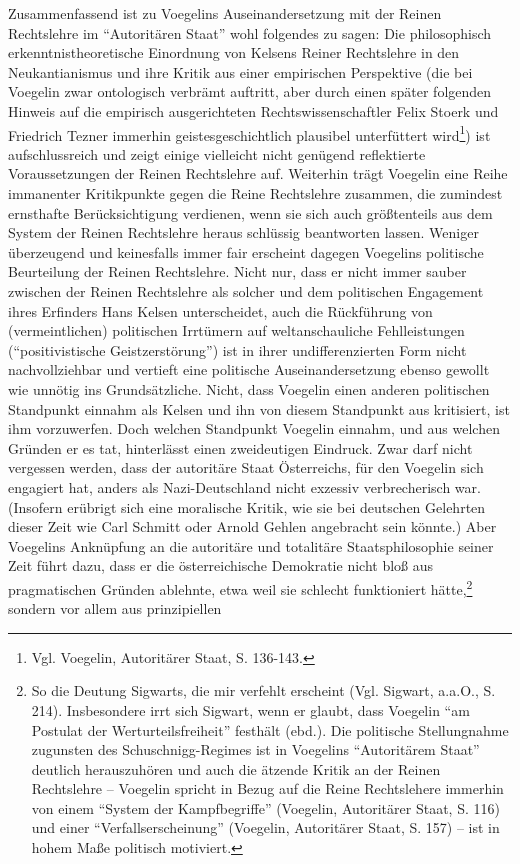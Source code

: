 \documentclass[12pt,a4paper,ngerman]{article}
\begin{document}
Zusammenfassend ist zu Voegelins Auseinandersetzung mit der Reinen Rechtslehre
im "`Autoritären Staat"' wohl folgendes zu sagen: Die philosophisch
erkenntnistheoretische Einordnung von Kelsens Reiner Rechtslehre in den
Neukantianismus und ihre Kritik aus einer empirischen Perspektive (die bei
Voegelin zwar ontologisch verbrämt auftritt, aber durch einen später folgenden
Hinweis auf die empirisch ausgerichteten Rechtswissenschaftler Felix Stoerk
und Friedrich Tezner immerhin geistesgeschichtlich plausibel unterfüttert
wird\footnote{Vgl.  Voegelin, Autoritärer Staat, S. 136-143.}) ist
aufschlussreich und zeigt einige vielleicht nicht genügend reflektierte
Voraussetzungen der Reinen Rechtslehre auf. Weiterhin trägt Voegelin eine
Reihe immanenter Kritikpunkte gegen die Reine Rechtslehre zusammen, die
zumindest ernsthafte Berücksichtigung verdienen, wenn sie sich auch
größtenteils aus dem System der Reinen Rechtslehre heraus schlüssig
beantworten lassen. Weniger überzeugend und keinesfalls immer fair erscheint
dagegen Voegelins politische Beurteilung der Reinen Rechtslehre. Nicht nur,
dass er nicht immer sauber zwischen der Reinen Rechtslehre als solcher und dem
politischen Engagement ihres Erfinders Hans Kelsen unterscheidet, auch die
Rückführung von (vermeintlichen) politischen Irrtümern auf weltanschauliche
Fehlleistungen ("`positivistische Geistzerstörung"') ist in ihrer
undifferenzierten Form nicht nachvollziehbar und vertieft eine politische
Auseinandersetzung ebenso gewollt wie unnötig ins Grundsätzliche.  Nicht, dass
Voegelin einen anderen politischen Standpunkt einnahm als Kelsen und ihn von
diesem Standpunkt aus kritisiert, ist ihm vorzuwerfen. Doch welchen Standpunkt
Voegelin einnahm, und aus welchen Gründen er es tat, hinterlässt einen
zweideutigen Eindruck. Zwar darf nicht vergessen werden, dass der autoritäre
Staat Österreichs, für den Voegelin sich engagiert hat, anders als
Nazi-Deutschland nicht exzessiv verbrecherisch war.  (Insofern erübrigt sich
eine moralische Kritik, wie sie bei deutschen Gelehrten dieser Zeit wie Carl
Schmitt oder Arnold Gehlen angebracht sein könnte.)  Aber Voegelins Anknüpfung
an die autoritäre und totalitäre Staatsphilosophie seiner Zeit führt dazu,
dass er die österreichische Demokratie nicht bloß aus pragmatischen Gründen
ablehnte, etwa weil sie schlecht funktioniert hätte,\footnote{So die Deutung
  Sigwarts, die mir verfehlt erscheint (Vgl. Sigwart, a.a.O., S. 214).
  Insbesondere irrt sich Sigwart, wenn er glaubt, dass Voegelin "`am Postulat
  der Werturteilsfreiheit"' festhält (ebd.).  Die politische Stellungnahme
  zugunsten des Schuschnigg-Regimes ist in Voegelins "`Autoritärem Staat"'
  deutlich herauszuhören und auch die ätzende Kritik an der Reinen Rechtslehre
  -- Voegelin spricht in Bezug auf die Reine Rechtslehere immerhin von einem
  "`System der Kampfbegriffe"' (Voegelin, Autoritärer Staat, S. 116) und einer
  "`Verfallserscheinung"' (Voegelin, Autoritärer Staat, S. 157) -- ist in
  hohem Maße politisch motiviert.}  sondern vor allem aus prinzipiellen
\end{document}

